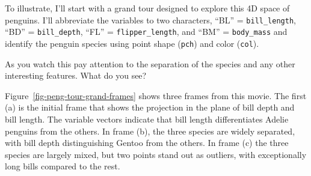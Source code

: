 \documentclass[
  letterpaper,
  10pt,
  krantz2]{krantz}
\makeatletter
\newenvironment{Shaded}{\begin{snugshade}}{\end{snugshade}}
\newcommand{\AttributeTok}[1]{\textcolor[rgb]{0.40,0.45,0.13}{#1}}
\newcommand{\DecValTok}[1]{\textcolor[rgb]{0.68,0.00,0.00}{#1}}
\newcommand{\FloatTok}[1]{\textcolor[rgb]{0.68,0.00,0.00}{#1}}
\newcommand{\FunctionTok}[1]{\textcolor[rgb]{0.28,0.35,0.67}{#1}}
\newcommand{\NormalTok}[1]{\textcolor[rgb]{0.00,0.23,0.31}{#1}}
\newcommand{\OtherTok}[1]{\textcolor[rgb]{0.00,0.23,0.31}{#1}}
\newcommand{\SpecialCharTok}[1]{\textcolor[rgb]{0.37,0.37,0.37}{#1}}
\newcommand{\StringTok}[1]{\textcolor[rgb]{0.13,0.47,0.30}{#1}}
\newenvironment{kframe}{%
  \medskip{}
  \setlength{\fboxsep}{.8em}
  \def\at@end@of@kframe{}%
  \ifinner\ifhmode%
  \def\at@end@of@kframe{\end{minipage}}%
  \begin{minipage}{\columnwidth}%
  \fi\fi%
  \def\FrameCommand##1{\hskip\@totalleftmargin \hskip-\fboxsep
  \colorbox{shadecolor}{##1}\hskip-\fboxsep
      \hskip-\linewidth \hskip-\@totalleftmargin \hskip\columnwidth}%
  \MakeFramed {\advance\hsize-\width
    \@totalleftmargin\z@ \linewidth\hsize
    \@setminipage}}%
{\par\unskip\endMakeFramed%
  \at@end@of@kframe}
\renewenvironment{Shaded}{\begin{kframe}}{\end{kframe}}
\makeatother
\begin{document}
To illustrate, I'll start with a grand tour designed to explore this 4D
space of penguins. I'll abbreviate the variables to two characters,
``BL'' = \texttt{bill\_length}, ``BD'' = \texttt{bill\_depth}, ``FL'' =
\texttt{flipper\_length}, and ``BM'' = \texttt{body\_mass} and identify
the penguin species using point shape (\texttt{pch}) and color
(\texttt{col}).

As you watch this pay attention to the separation of the species and any
other interesting features. What do you see?

\begin{Shaded}
\end{Shaded}

Figure~\ref{fig-peng-tour-grand-frames} shows three frames from this
movie. The first (a) is the initial frame that shows the projection in
the plane of bill depth and bill length. The variable vectors indicate
that bill length differentiates Adelie penguins from the others. In
frame (b), the three species are widely separated, with bill depth
distinguishing Gentoo from the others. In frame (c) the three species
are largely mixed, but two points stand out as outliers, with
exceptionally long bills compared to the rest.
\end{document}
